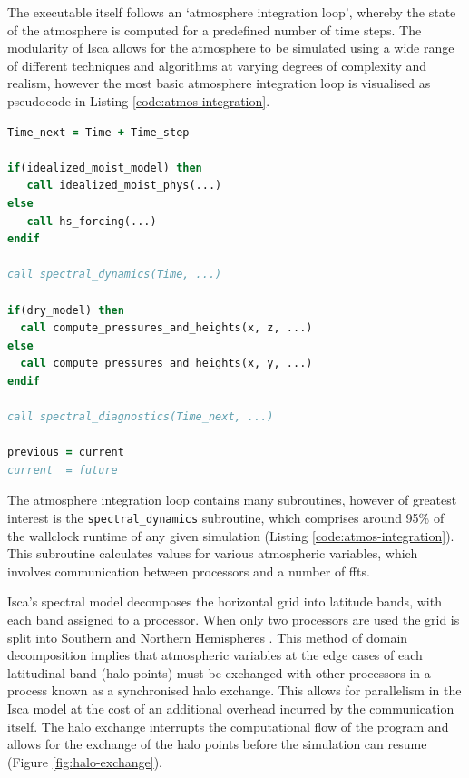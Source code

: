 \documentclass[a4paper,11pt]{report}
\begin{document}
\par
\par
The executable itself follows an `atmosphere integration loop', whereby the state of the atmosphere is computed for a predefined number of time steps. The modularity of Isca allows for the atmosphere to be simulated using a wide range of different techniques and algorithms at varying degrees of complexity and realism, however the most basic atmosphere integration loop is visualised as pseudocode in Listing \ref{code:atmos-integration}.

\begin{lstlisting}[language=Fortran,label={code:atmos-integration},caption={Pseudocode for the atmospheric integration loop found in Isca.}]
Time_next = Time + Time_step

if(idealized_moist_model) then
   call idealized_moist_phys(...)
else
   call hs_forcing(...)
endif

call spectral_dynamics(Time, ...)

if(dry_model) then
  call compute_pressures_and_heights(x, z, ...)
else
  call compute_pressures_and_heights(x, y, ...)
endif

call spectral_diagnostics(Time_next, ...)

previous = current
current  = future
\end{lstlisting}
\par
The atmosphere integration loop contains many subroutines, however of greatest interest is the \texttt{spectral\_dynamics} subroutine, which comprises around 95\% of the wallclock runtime of any given simulation (Listing \ref{code:atmos-integration}). This subroutine calculates values for various atmospheric variables, which involves  communication between processors and a number of \gls{fft}s. 
\par
Isca's spectral model decomposes the horizontal grid into latitude bands, with each band assigned to a processor. When only two processors are used the grid is split into Southern and Northern Hemispheres \cite{isca2019github}. This method of domain decomposition implies that atmospheric variables at the edge cases of each latitudinal band (halo points) must be exchanged with other processors in a process known as a synchronised halo exchange. This allows for parallelism in the Isca model at the cost of an additional overhead incurred by the communication itself. The halo exchange interrupts the computational flow of the program and allows for the exchange of the halo points before the simulation can resume (Figure \ref{fig:halo-exchange}).
\end{document}

